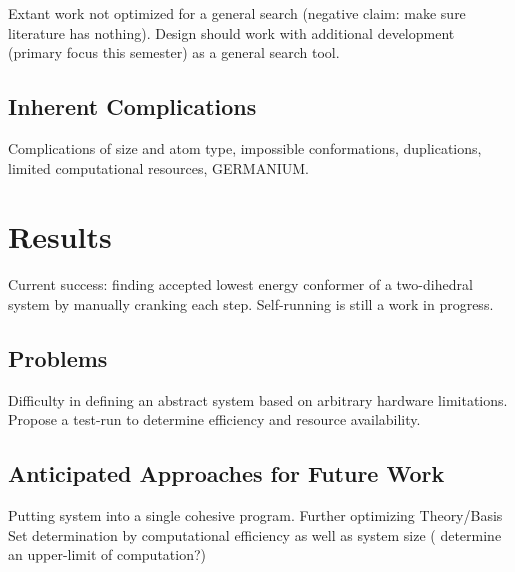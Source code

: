Extant work not optimized for a general search (negative claim: make sure literature has nothing). 
Design should work with additional development (primary focus this semester) as a general search tool. 


\subsection{Inherent Complications}

Complications of size and atom type, impossible conformations, duplications, limited computational resources, GERMANIUM.

\section{Results}

Current success: finding accepted lowest energy conformer of a two-dihedral system by manually cranking each step. 
Self-running is still a work in progress.

\subsection{Problems}

Difficulty in defining an abstract system based on arbitrary hardware limitations. Propose a test-run to determine efficiency and resource availability.

\subsection{Anticipated Approaches for Future Work}

Putting system into a single cohesive program. Further optimizing Theory/Basis Set determination by computational efficiency as well as system size ( determine an upper-limit of computation?)